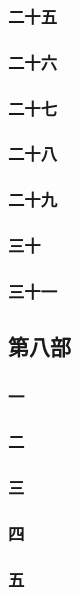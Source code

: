 \subsubsection*{二十五}
\subsubsection*{二十六}
\subsubsection*{二十七}
\subsubsection*{二十八}
\subsubsection*{二十九}
\subsubsection*{三十}
\subsubsection*{三十一}







\subsection*{第八部}





\subsubsection*{一}
\subsubsection*{二}
\subsubsection*{三}
\subsubsection*{四}
\subsubsection*{五}
